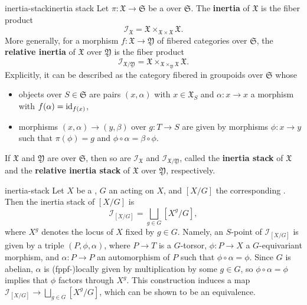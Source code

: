 \begin{topic}{inertia-stack}{inertia stack}
    Let $\pi \colon \mathfrak{X} \to \mathfrak{S}$ be a  over $\mathfrak{S}$. The \textbf{inertia} of $\mathfrak{X}$ is the fiber product
    \[ \mathcal{I}_\mathfrak{X} = \mathfrak{X} \times_{\mathfrak{X} \times \mathfrak{X}} \mathfrak{X} . \]
    More generally, for a morphism $f \colon \mathfrak{X} \to \mathfrak{Y}$ of fibered categories over $\mathfrak{S}$, the \textbf{relative inertia} of $\mathfrak{X}$ over $\mathfrak{Y}$ is the fiber product
    \[ \mathcal{I}_{\mathfrak{X}/\mathfrak{Y}} = \mathfrak{X} \times_{\mathfrak{X} \times_\mathfrak{Y} \mathfrak{X}} \mathfrak{X} . \]
    Explicitly, it can be described as the category fibered in groupoids over $\mathfrak{S}$ whose
    \begin{itemize}
        \item objects over $S \in \mathfrak{S}$ are pairs $(x, \alpha)$ with $x \in \mathfrak{X}_S$ and $\alpha \colon x \to x$ a morphism with $f(\alpha) = \textup{id}_{f(x)}$,
        \item morphisms $(x, \alpha) \to (y, \beta)$ over $g \colon T \to S$ are given by morphisms $\phi \colon x \to y$ such that $\pi(\phi) = g$ and $\phi \circ \alpha = \beta \circ \phi$.
    \end{itemize}    
    If $\mathfrak{X}$ and $\mathfrak{Y}$ are  over $\mathfrak{S}$, then so are $\mathcal{I}_\mathfrak{X}$ and $\mathcal{I}_{\mathfrak{X}/\mathfrak{Y}}$, called the \textbf{inertia stack} of $\mathfrak{X}$ and the \textbf{relative inertia stack} of $\mathfrak{X}$ over $\mathfrak{Y}$, respectively.
\end{topic}

\begin{example}{inertia-stack}
    Let $X$ be a , $G$ an  acting on $X$, and $[X/G]$ the corresponding . Then the inertia stack of $[X/G]$ is
    \[ \mathcal{I}_{[X/G]} = \bigsqcup_{g \in G} [X^g / G] , \]
    where $X^g$ denotes the locus of $X$ fixed by $g \in G$. Namely, an $S$-point of $\mathcal{I}_{[X/G]}$ is given by a triple $(P, \phi, \alpha)$, where $P \to T$ is a $G$-torsor, $\phi \colon P \to X$ a $G$-equivariant morphism, and $\alpha \colon P \to P$ an automorphism of $P$ such that $\phi \circ \alpha = \phi$. Since $G$ is abelian, $\alpha$ is (fppf-)locally given by multiplication by some $g \in G$, so $\phi \circ \alpha = \phi$ implies that $\phi$ factors through $X^g$. This construction induces a map $\mathcal{I}_{[X/G]} \to \bigsqcup_{g \in G} [X^g/G]$, which can be shown to be an equivalence.
\end{example}

